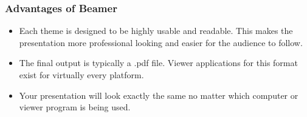 \documentclass[aspectratio=169,utf8]{ctexbeamer}
\begin{document}
\begin{frame}
  \frametitle{Advantages of Beamer}

  \begin{itemize}
    \setlength{\itemsep}{8pt}
    \item Each theme is designed to be highly usable and readable. This makes the presentation more professional looking and easier for the audience to follow.
    \item The final output is typically a \alert{.pdf} file. Viewer applications for this format exist for virtually every platform.
    \item \alert{Your presentation will look exactly the same no matter which computer or viewer program is being used.}
  \end{itemize}
  
\end{frame}
\end{document}
